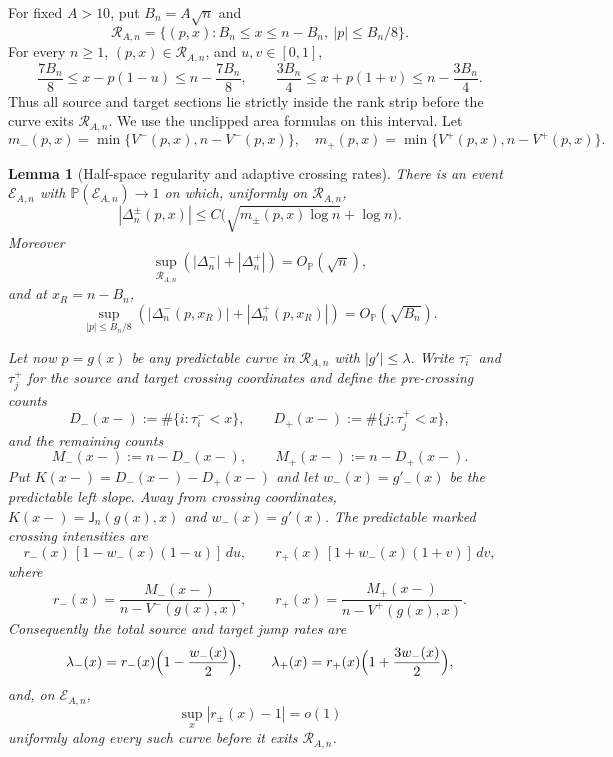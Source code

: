\documentclass[11pt,reqno]{amsart}
\newtheorem{lemma}[theorem]{Lemma}
\theoremstyle{definition}
\theoremstyle{remark}
\numberwithin{equation}{section}
\newcommand{\Pp}{\mathbb P}
\begin{document}
For fixed \(A>10\), put \(B_n=A\sqrt n\) and
\begin{equation}
\mathcal R_{A,n}
=
\{(p,x): B_n\le x\le n-B_n,\ |p|\le B_n/8\}.
\label{eq:1.9}
\end{equation}
For every \(n\ge1\), \((p,x)\in\mathcal R_{A,n}\), and \(u,v\in[0,1]\),
\[
\frac{7B_n}{8}\le x-p(1-u)\le n-\frac{7B_n}{8},
\qquad
\frac{3B_n}{4}\le x+p(1+v)\le n-\frac{3B_n}{4}.
\]
Thus all source and target sections lie strictly inside the rank strip
before the curve exits \(\mathcal R_{A,n}\).  We use the unclipped area
formulas on this interval.
Let
\[
m_-(p,x)=\min\{V^-(p,x),n-V^-(p,x)\},
\quad
m_+(p,x)=\min\{V^+(p,x),n-V^+(p,x)\}.
\]

\begin{lemma}[Half-space regularity and adaptive crossing rates]
\label{lem:rates}
There is an event \(\mathcal E_{A,n}\) with
\(\Pp(\mathcal E_{A,n})\to1\) on which, uniformly on
\(\mathcal R_{A,n}\),
\begin{equation}
|\Delta_n^\pm(p,x)|
\le
C\bigl(\sqrt{m_\pm(p,x)\log n}+\log n\bigr).
\label{eq:1.10}
\end{equation}
Moreover
\begin{equation}
\sup_{\mathcal R_{A,n}}
(|\Delta_n^-|+|\Delta_n^+|)
=O_{\Pp}(\sqrt n),
\label{eq:1.11}
\end{equation}
and at \(x_R=n-B_n\),
\begin{equation}
\sup_{|p|\le B_n/8}
(|\Delta_n^-(p,x_R)|+|\Delta_n^+(p,x_R)|)
=
O_{\Pp}(\sqrt{B_n}).
\label{eq:1.12}
\end{equation}

Let now \(p=g(x)\) be any predictable curve in \(\mathcal R_{A,n}\)
with \(|g'|\le\lambda\).  Write \(\tau_i^-\) and \(\tau_j^+\) for the
source and target crossing coordinates and define the pre-crossing counts
\[
D_-(x-):=\#\{i:\tau_i^-<x\},
\qquad
D_+(x-):=\#\{j:\tau_j^+<x\},
\]
and the remaining counts
\[
M_-(x-):=n-D_-(x-),
\qquad
M_+(x-):=n-D_+(x-).
\]
Put \(K(x-)=D_-(x-)-D_+(x-)\) and let
\(w_-(x)=g'_-(x)\) be the predictable left slope.  Away from crossing
coordinates, \(K(x-)=\mathsf J_n(g(x),x)\) and \(w_-(x)=g'(x)\).
The predictable \emph{marked} crossing intensities are
\begin{equation}
r_-(x)\,[1-w_-(x)(1-u)]\,du,
\qquad
r_+(x)\,[1+w_-(x)(1+v)]\,dv,
\label{eq:1.13}
\end{equation}
where
\begin{equation}
r_-(x)
=
\frac{M_-(x-)}{n-V^-(g(x),x)},
\qquad
r_+(x)
=
\frac{M_+(x-)}{n-V^+(g(x),x)}.
\label{eq:1.14}
\end{equation}
Consequently the total source and target jump rates are
\begin{equation}
\lambda_-(x)
=
r_-(x)\Bigl(1-\frac {w_-(x)}2\Bigr),
\qquad
\lambda_+(x)
=
r_+(x)\Bigl(1+\frac{3w_-(x)}{2}\Bigr),
\label{eq:1.15}
\end{equation}
and, on \(\mathcal E_{A,n}\),
\begin{equation}
\sup_x|r_\pm(x)-1|=o(1)
\label{eq:1.16}
\end{equation}
uniformly along every such curve before it exits
\(\mathcal R_{A,n}\).
\end{lemma}
\end{document}
